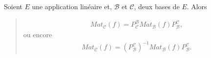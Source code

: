 \documentclass[letterpaper,11pt,english]{sphinxmanual}
\begin{document}
\begin{DUlineblock}{0em}
\item[] 
\item[] Soient \(E\) une application linéaire et, \(\mathcal{B}\) et
\(\mathcal{C}\), deux bases de \(E\). Alors
\end{DUlineblock}
\begin{quote}
\begin{equation}\label{equation:chapter2:chapter2:11}
\begin{split}Mat_{\mathcal{C}}(f)=P_{\mathcal{C}}^{\mathcal{B}} Mat_{\mathcal{B}}(f)P_{\mathcal{B}}^{\mathcal{C}},\end{split}
\end{equation}
\sphinxAtStartPar
ou encore
\begin{equation}\label{equation:chapter2:chapter2:12}
\begin{split}Mat_{\mathcal{C}}(f)=(P_{\mathcal{B}}^{\mathcal{C}})^{-1} Mat_{\mathcal{B}}(f)P_{\mathcal{B}}^{\mathcal{C}}.\end{split}
\end{equation}\end{quote}
\end{document}
